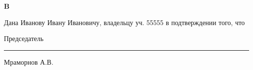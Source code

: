 \vspace{10mm}
\begin{center}
	\Large\textbf{ B}
\end{center}
\par

Дана Иванову Ивану Ивановичу, владельцу уч. 55555 в подтверждении того, что 

\vspace{35mm}
Председатель \hfill    \rule{4cm}{0.1 mm}    Мраморнов А.В.




